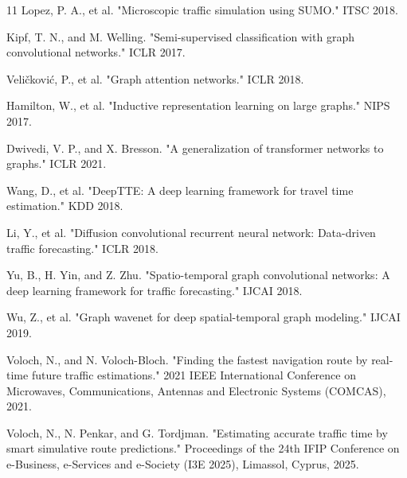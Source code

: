 \documentclass[12pt,a4paper]{article}
\begin{document}
\begin{thebibliography}{11}
 Lopez, P. A., et al. "Microscopic traffic simulation using SUMO." ITSC 2018.

 Kipf, T. N., and M. Welling. "Semi-supervised classification with graph convolutional networks." ICLR 2017.

 Veličković, P., et al. "Graph attention networks." ICLR 2018.

 Hamilton, W., et al. "Inductive representation learning on large graphs." NIPS 2017.

 Dwivedi, V. P., and X. Bresson. "A generalization of transformer networks to graphs." ICLR 2021.

 Wang, D., et al. "DeepTTE: A deep learning framework for travel time estimation." KDD 2018.

 Li, Y., et al. "Diffusion convolutional recurrent neural network: Data-driven traffic forecasting." ICLR 2018.

 Yu, B., H. Yin, and Z. Zhu. "Spatio-temporal graph convolutional networks: A deep learning framework for traffic forecasting." IJCAI 2018.

 Wu, Z., et al. "Graph wavenet for deep spatial-temporal graph modeling." IJCAI 2019.

 Voloch, N., and N. Voloch-Bloch. "Finding the fastest navigation route by real-time future traffic estimations." 2021 IEEE International Conference on Microwaves, Communications, Antennas and Electronic Systems (COMCAS), 2021.

 Voloch, N., N. Penkar, and G. Tordjman. "Estimating accurate traffic time by smart simulative route predictions." Proceedings of the 24th IFIP Conference on e-Business, e-Services and e-Society (I3E 2025), Limassol, Cyprus, 2025.
\end{thebibliography}
\end{document}
